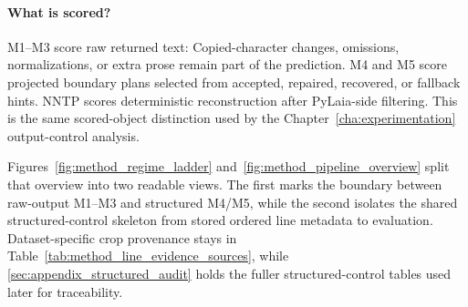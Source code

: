 \paragraph{What is scored?}
M1--M3 score raw returned text: Copied-character changes, omissions, normalizations, or extra prose remain part of the prediction. M4 and M5 score projected boundary plans selected from accepted, repaired, recovered, or fallback hints. NNTP scores deterministic reconstruction after PyLaia-side filtering. This is the same scored-object distinction used by the Chapter~\ref{cha:experimentation} output-control analysis.

Figures~\ref{fig:method_regime_ladder} and~\ref{fig:method_pipeline_overview} split that overview into two readable views. The first marks the boundary between raw-output M1--M3 and structured M4/M5, while the second isolates the shared structured-control skeleton from stored ordered line metadata to evaluation. Dataset-specific crop provenance stays in Table~\ref{tab:method_line_evidence_sources}, while \autoref{sec:appendix_structured_audit} holds the fuller structured-control tables used later for traceability.

